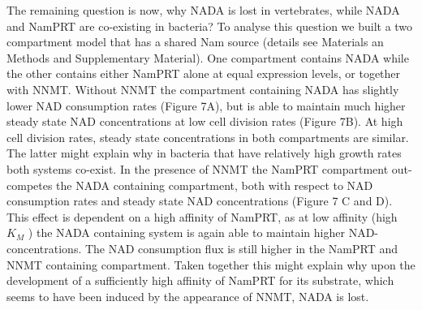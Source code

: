 The remaining question is now, why NADA is lost in vertebrates, while NADA and NamPRT are co-existing in bacteria? To analyse this question we built a two compartment model that has a shared Nam source (details see Materials an Methods and Supplementary Material). One compartment contains NADA while the other contains either NamPRT alone at equal expression levels, or together with NNMT.  Without NNMT the compartment containing NADA has slightly lower NAD consumption rates (Figure 7A), but is able to maintain much higher steady state NAD concentrations at low cell division rates  (Figure 7B). At high cell division rates, steady state concentrations in both compartments are similar. The latter might explain why in bacteria that have relatively high growth rates both systems co-exist. 
In the presence of NNMT the NamPRT compartment out-competes the NADA containing compartment, both with respect to NAD consumption rates and steady state NAD concentrations (Figure 7 C and D). This effect is dependent on a high affinity of NamPRT, as at low affinity (high $K_M$ ) the NADA containing system is again able to maintain higher NAD-concentrations. The NAD consumption flux is still  higher  in the NamPRT and NNMT containing compartment. Taken together this might explain why upon the development of a sufficiently high affinity of NamPRT for its substrate, which seems to have been induced by the appearance of NNMT, NADA is lost.

